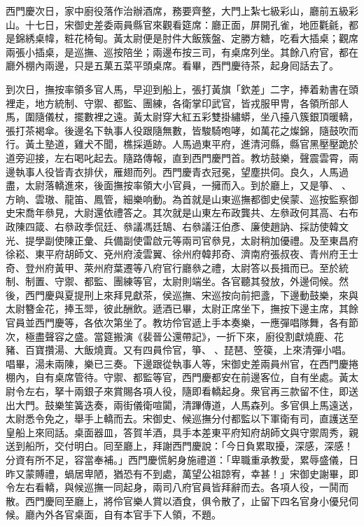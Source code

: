 西門慶次日，家中廚役落作治辦酒席，務要齊整，大門上紮七級彩山，廳前五級彩山。十七日，宋御史差委兩員縣官來觀看筵席：廳正面，屏開孔雀，地匝氍毹，都是錦綉桌幃，粧花椅甸。黃太尉便是肘件大飯簇盤、定勝方糖，吃看大插桌；觀席兩張小插桌，是巡撫、巡按陪坐；兩邊布按三司，有桌席列坐。其餘八府官，都在廳外棚內兩邊，只是五菓五菜平頭桌席。看畢，西門慶待茶，起身囘話去了。

到次日，撫按率領多官人馬，早迎到船上，張打黃旗「欽差」二字，捧着勑書在頭裡走，地方統制、守禦、都監、團練，各衛掌印武官，皆戎服甲冑，各領所部人馬，圍隨儀杖，擺數裡之遠。黃太尉穿大紅五彩雙掛繡蟒，坐八擡八簇銀頂暖轎，張打茶褐傘。後邊名下執事人役跟隨無數，皆駿騎咆哮，如萬花之燦錦，隨鼓吹而行。黃土塾道，雞犬不聞，樵採遁跡。人馬過東平府，進清河縣，縣官黑壓壓跪於道旁迎接，左右喝叱起去。隨路傳報，直到西門慶門首。教坊鼓樂，聲震雲霄，兩邊執事人役皆青衣排伏，雁翅而列。西門慶青衣冠冕，望塵拱伺。{}良久，人馬過盡，太尉落轎進來，後面撫按率領大小官員，一擁而入。到於廳上，又是箏、𥱧、方晌、雲璈、龍笛、鳳管，細樂响動。為首就是山東巡撫都御史侯蒙、巡按監察御史宋喬年叅見，大尉還依禮答之。其次就是山東左布政龔共、左叅政何其高、右布政陳四箴、右叅政季侃廷、叅議馮廷鵠、右叅議汪伯彥、廉使趙訥、採訪使韓文光、提學副使陳正彙、兵備副使雷啟元等兩司官叅見，太尉稍加優禮。及至東昌府徐崧、東平府胡師文、兗州府淩雲翼、徐州府韓邦奇、濟南府張叔夜、青州府王士奇、登州府黃甲、萊州府葉遷等八府官行廳叅之禮，太尉答以長揖而已。至於統制、制置、守禦、都監、團練等官，太尉則端坐。各官聽其發放，外邊伺候。然後，西門慶與夏提刑上來拜見獻茶，{}侯巡撫、宋巡按向前把盞，下邊動鼓樂，來與太尉簪金花，捧玉斝，彼此酬飲。遞酒已畢，太尉正席坐下，撫按下邊主席，其餘官員並西門慶等，各依次第坐了。教坊伶官遞上手本奏樂，一應彈唱隊舞，各有節次，極盡聲容之盛。當筵搬演《裴晉公還帶記》，一折下來，廚役割獻燒鹿、花豬、百寶攢湯、大飯燒賣。又有四員伶官，箏、𥱧、琵琶、箜篌，上來清彈小唱。唱畢，湯未兩陳，樂已三奏。下邊跟從執事人等，宋御史差兩員州官，在西門慶捲棚內，自有桌席管待。守禦、都監等官，西門慶都安在前邊客位，自有坐處。黃太尉令左右，拏十兩銀子來賞賜各項人役，隨即看轎起身。衆官再三款留不住，即送出大門。鼓樂笙簧迭奏，兩街儀衛喧闐，清蹕傳道，人馬森列。多官俱上馬遠送，太尉悉令免之，舉手上轎而去。{}宋御史、候巡撫分付都監以下軍衛有司，直護送至皇船上來囘話。桌面器皿，答賀羊酒，具手本差東平府知府胡師文與守禦周秀，親送到船所，交付明白。囘至廳上，拜謝西門慶說：「今日負累取擾，深感，深感！分資有所不足，容當奉補。」西門慶慌躬身施禮道：「卑職重承教愛，累辱盛儀，日昨又蒙賻禮，蝸居卑陋，猶恐有不到處，萬望公祖諒宥，幸甚！」宋御史謝畢，即令左右看轎，與候巡撫一同起身，兩司八府官員皆拜辭而去。各項人役，一鬨而散。西門慶囘至廳上，將伶官樂人賞以酒食，俱令散了，止留下四名官身小優兒伺候。廳內外各官桌面，自有本官手下人領，{}不題。

